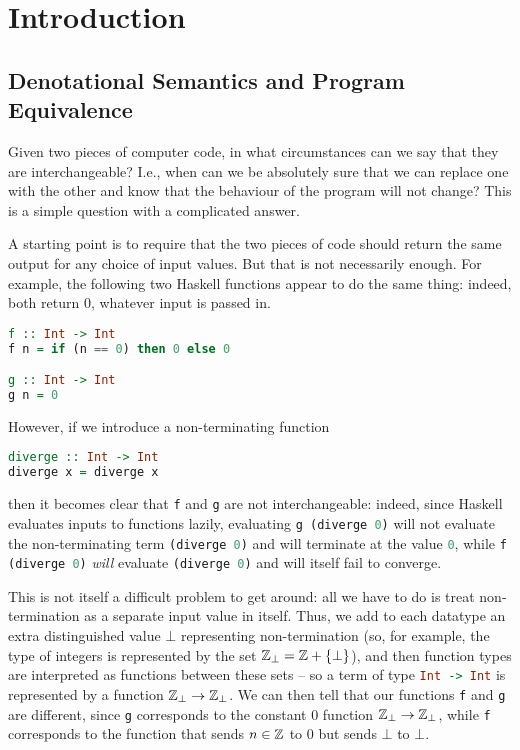 \chapter{Introduction}

\section{Denotational Semantics and Program Equivalence}

Given two pieces of computer code, in what circumstances can we say that they are interchangeable?
I.e., when can we be absolutely sure that we can replace one with the other and know that the behaviour of the program will not change?
This is a simple question with a complicated answer.

A starting point is to require that the two pieces of code should return the same output for any choice of input values. 
But that is not necessarily enough.
For example, the following two Haskell functions appear to do the same thing: indeed, both return $0$, whatever input is passed in.

\begin{lstlisting}[language=haskell]
f :: Int -> Int
f n = if (n == 0) then 0 else 0

g :: Int -> Int
g n = 0
\end{lstlisting}

However, if we introduce a non-terminating function
\begin{lstlisting}[language=haskell]
diverge :: Int -> Int
diverge x = diverge x
\end{lstlisting}
then it becomes clear that \lstinline[language=haskell]{f} and \lstinline[language=haskell]{g} are not interchangeable: indeed, since Haskell evaluates inputs to functions lazily, evaluating \lstinline[language=haskell]{g (diverge 0)} will not evaluate the non-terminating term \lstinline[language=haskell]{(diverge 0)} and will terminate at the value \lstinline[language=haskell]{0}, while \lstinline[language=haskell]{f (diverge 0)} \emph{will} evaluate \lstinline[language=haskell]{(diverge 0)} and will itself fail to converge.

This is not itself a difficult problem to get around: all we have to do is treat non-termination as a separate input value in itself.
Thus, we add to each datatype an extra distinguished value $\bot$ representing non-termination (so, for example, the type of integers is represented by the set $\mathbb{Z}_\bot = \mathbb{Z} + \{\bot\}$), and then function types are interpreted as functions between these sets -- so a term of type \lstinline[language=haskell]{Int -> Int} is represented by a function $\mathbb{Z}_\bot \to \mathbb{Z}_\bot$.
We can then tell that our functions \lstinline[language=haskell]{f} and \lstinline[language=haskell]{g} are different, since \lstinline[language=haskell]{g} corresponds to the constant $0$ function $\mathbb{Z}_\bot \to \mathbb{Z}_\bot$, while \lstinline[language=haskell]{f} corresponds to the function that sends $n\in \mathbb{Z}$ to $0$ but sends $\bot$ to $\bot$.

